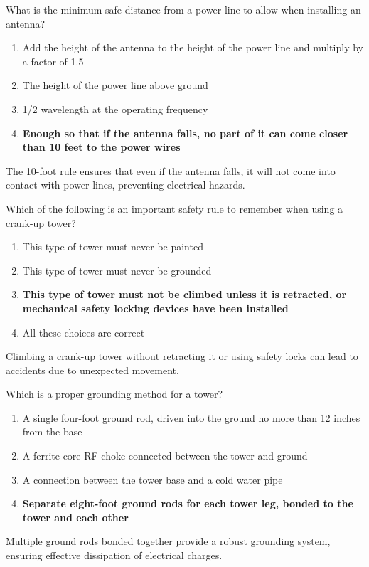 
\begin{tcolorbox}[colback=gray!10!white,colframe=black!75!black,title={T0B06}]
What is the minimum safe distance from a power line to allow when installing an antenna?
\begin{enumerate}[label=\Alph*,noitemsep]
    \item Add the height of the antenna to the height of the power line and multiply by a factor of 1.5
    \item The height of the power line above ground
    \item 1/2 wavelength at the operating frequency
    \item \textbf{Enough so that if the antenna falls, no part of it can come closer than 10 feet to the power wires}
\end{enumerate}
\end{tcolorbox}
The 10-foot rule ensures that even if the antenna falls, it will not come into contact with power lines, preventing electrical hazards.


\begin{tcolorbox}[colback=gray!10!white,colframe=black!75!black,title={T0B07}]
Which of the following is an important safety rule to remember when using a crank-up tower?
\begin{enumerate}[label=\Alph*,noitemsep]
    \item This type of tower must never be painted
    \item This type of tower must never be grounded
    \item \textbf{This type of tower must not be climbed unless it is retracted, or mechanical safety locking devices have been installed}
    \item All these choices are correct
\end{enumerate}
\end{tcolorbox}
Climbing a crank-up tower without retracting it or using safety locks can lead to accidents due to unexpected movement.


\begin{tcolorbox}[colback=gray!10!white,colframe=black!75!black,title={T0B08}]
Which is a proper grounding method for a tower?
\begin{enumerate}[label=\Alph*,noitemsep]
    \item A single four-foot ground rod, driven into the ground no more than 12 inches from the base
    \item A ferrite-core RF choke connected between the tower and ground
    \item A connection between the tower base and a cold water pipe
    \item \textbf{Separate eight-foot ground rods for each tower leg, bonded to the tower and each other}
\end{enumerate}
\end{tcolorbox}
Multiple ground rods bonded together provide a robust grounding system, ensuring effective dissipation of electrical charges.

